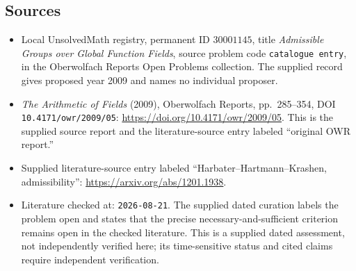 \documentclass[11pt]{article}
\begin{document}
\subsection{Sources}
\begin{itemize}
\item Local UnsolvedMath registry, permanent ID \(30001145\), title \emph{Admissible Groups over Global Function Fields}, source problem code \texttt{catalogue entry}, in the Oberwolfach Reports Open Problems collection. The supplied record gives proposed year 2009 and names no individual proposer.
\item \emph{The Arithmetic of Fields} (2009), Oberwolfach Reports, pp.\ 285--354, DOI \texttt{10.4171/owr/2009/05}: \url{https://doi.org/10.4171/owr/2009/05}. This is the supplied source report and the literature-source entry labeled ``original OWR report.''
\item Supplied literature-source entry labeled ``Harbater--Hartmann--Krashen, admissibility'': \url{https://arxiv.org/abs/1201.1938}.
\item Literature checked at: \texttt{2026-08-21}. The supplied dated curation labels the problem open and states that the precise necessary-and-sufficient criterion remains open in the checked literature. This is a supplied dated assessment, not independently verified here; its time-sensitive status and cited claims require independent verification.
\end{itemize}
\end{document}
